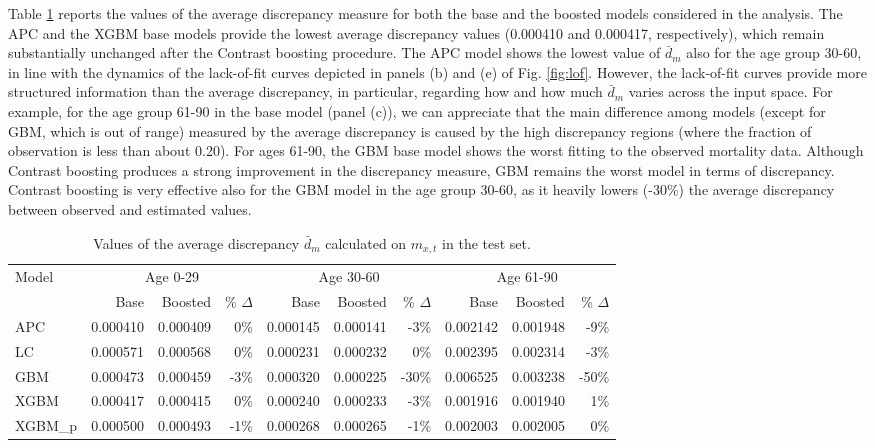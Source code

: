 \documentclass[a4,11pt]{article}
\begin{document}
%
Table \ref{tab:avecri} reports the values of the average discrepancy measure for both the base and the boosted models considered in the analysis. 
The APC and the XGBM base models provide the lowest average discrepancy values (0.000410 and 0.000417, respectively), which remain substantially unchanged after the Contrast boosting procedure.
The APC model shows the lowest value of $\bar{d}_m$ also for the age group 30-60, in line with the dynamics of the lack-of-fit curves depicted in panels (b) and (e) of Fig. \ref{fig:lof}.
However, the lack-of-fit curves provide more structured information than the average discrepancy, in particular, regarding how and how much $\bar{d}_m$ varies across the input space. For example, for the age group 61-90 in the base model (panel (c)), we can appreciate that the main difference among models (except for GBM, which is out of range) measured by the average discrepancy is caused by the high discrepancy regions (where the fraction of observation is less than about 0.20). 
For ages 61-90, the GBM base model shows the worst fitting to the observed mortality data. Although Contrast boosting produces a strong improvement in the discrepancy measure, GBM remains the worst model in terms of discrepancy. Contrast boosting is very effective also for the GBM model in the age group 30-60, as it heavily lowers (-30\%) the average discrepancy between observed and estimated values.
%
\begin{table}[ht]
\centering
\scriptsize
\begin{tabular}{|l|r|r|r|r|r|r|r|r|r|}
\hline
\multirow{2}{*}{Model} & \multicolumn{3}{c|}{Age 0-29} & \multicolumn{3}{c|}{Age 30-60} & \multicolumn{3}{c|}{Age 61-90} \\
\cline{2-10}
&	Base 	&	Boosted 	& \% $\Delta$ &	Base 	&	Boosted 	& \% $\Delta$ &	Base 	&	Boosted	& \% $\Delta$\\
\hline
APC 	&	0.000410	&	0.000409	&	0\%	&	0.000145	&	0.000141	&	-3\%	&	0.002142	&	0.001948	&	-9\%	\\
LC 	&	0.000571	&	0.000568	&	0\%	&	0.000231	&	0.000232	&	0\%	&	0.002395	&	0.002314	&	-3\%	\\
GBM 	&	0.000473	&	0.000459	&	-3\%	&	0.000320	&	0.000225	&	-30\%	&	0.006525	&	0.003238	&	-50\%	\\
XGBM 	&	0.000417	&	0.000415	&	0\%	&	0.000240	&	0.000233	&	-3\%	&	0.001916	&	0.001940	&	1\%	\\
XGBM\_p 	&	0.000500	&	0.000493	&	-1\%	&	0.000268	&	0.000265	&	-1\%	&	0.002003	&	0.002005	&	0\%	\\
\hline
\end{tabular}
\caption{Values of the average discrepancy $\bar{d}_m$ calculated on $m_{x,t}$ in the test set.}
\label{tab:avecri}
\end{table}\\
\end{document}

